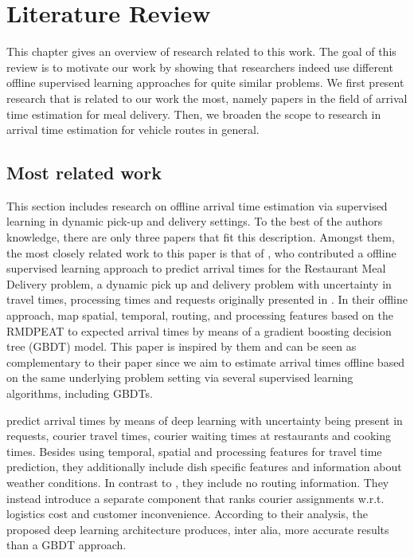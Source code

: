 \chapter{Literature Review}
\label{chap:review}
This chapter gives an overview of research related to this work. The goal of this review is to motivate our work by showing that researchers indeed use different offline supervised learning approaches for quite similar problems. We first present research that is related to our work the most, namely papers in the field of arrival time estimation for meal delivery. Then, we broaden the scope to research in arrival time estimation for vehicle routes in general.    

\section{Most related work}
\label{sec:msr}
This section includes research on offline arrival time estimation via supervised learning in dynamic pick-up and delivery settings.
To the best of the authors knowledge, there are only three papers that fit this description. Amongst them, the most closely related work to this paper is that of \citet{Hildebrandt2020_EAT}, who contributed a offline supervised learning approach to predict arrival times for the Restaurant Meal Delivery problem, a dynamic pick up and delivery problem with uncertainty in travel times, processing times and requests originally presented in \citet{UlmerRMDP}.
In their offline approach, \citet{Hildebrandt2020_EAT} map spatial, temporal, routing, and processing features based on the RMDPEAT to expected arrival times by means of a gradient boosting decision tree (GBDT) model. This paper is inspired by them and can be seen as complementary to their paper since we aim to estimate arrival times offline based on the same underlying problem setting via several supervised learning algorithms, including GBDTs.

\citet{Zhu2020_OFCTE_DL} predict arrival times by means of deep learning with uncertainty being present in requests, courier travel times, courier waiting times at restaurants and cooking times. Besides using temporal, spatial and processing features for travel time prediction, they additionally include dish specific features and information about weather conditions. In contrast to \citet{Hildebrandt2020_EAT}, they include no routing information. They instead introduce a separate component that ranks courier assignments w.r.t. logistics cost and customer inconvenience. According to their analysis, the proposed deep learning architecture produces, inter alia, more accurate results than a GBDT approach.

